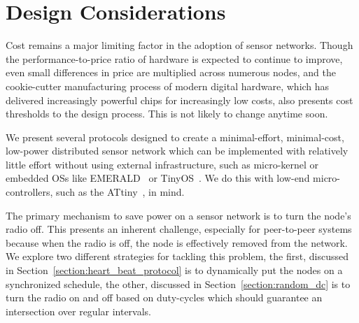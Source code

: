\section{Design Considerations}
\label{section:design_considerations}

Cost remains a major limiting factor in the adoption of sensor networks.  Though the performance-to-price ratio of
hardware is expected to continue to improve, even small differences in price are multiplied across numerous nodes,
and the cookie-cutter manufacturing process of modern digital hardware, which has delivered increasingly powerful
chips for increasingly low costs, also presents cost thresholds to the design process.  This is not likely to change
anytime soon.

We present several protocols designed to create a minimal-effort, minimal-cost, low-power distributed sensor network
which can be implemented with relatively little effort without using external infrastructure, such as micro-kernel or
embedded OSs like EMERALD~\cite{zuberi99} or TinyOS~\cite{tinyos}.  We do this with low-end micro-controllers, such
as the ATtiny~\cite{attinyds}, in mind.

The primary mechanism to save power on a sensor network is to turn the node's radio off.  This presents an inherent
challenge, especially for peer-to-peer systems because when the radio is off, the node is effectively removed from
the network.  We explore two different strategies for tackling this problem, the first, discussed in
Section~\ref{section:heart_beat_protocol} is to dynamically put the nodes
on a synchronized schedule, the other, discussed in Section~\ref{section:random_dc} is to turn the radio on and off
based on duty-cycles which should guarantee an intersection over regular intervals.

